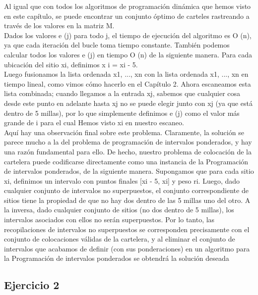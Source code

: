 \documentclass[a4paper, 12pt]{book}
\theoremstyle{dotless}
\begin{document}
Al igual que con todos los algoritmos de programación dinámica que hemos visto en este capítulo, se puede encontrar un conjunto óptimo de carteles rastreando a través de los valores en la matriz M.\\

Dados los valores e (j) para todo j, el tiempo de ejecución del algoritmo es O (n), ya que cada iteración del bucle toma tiempo constante. También podemos calcular todos los valores e (j) en tiempo O (n) de la siguiente manera. Para cada ubicación del sitio xi, definimos x i = xi - 5.\\

Luego fusionamos la lista ordenada x1, ..., xn con la lista ordenada x1, ..., xn en tiempo lineal, como vimos cómo hacerlo en el Capítulo 2. Ahora escaneamos esta lista combinada; cuando llegamos a la entrada xj, sabemos que cualquier cosa desde este punto en adelante hasta xj no se puede elegir junto con xj (ya que está dentro de 5 millas), por lo que simplemente definimos e (j) como el valor más grande de i para el cual Hemos visto xi en nuestro escaneo.\\

Aquí hay una observación final sobre este problema. Claramente, la solución se parece mucho a la del problema de programación de intervalos ponderados, y hay una razón fundamental para ello. De hecho, nuestro problema de colocación de la cartelera puede codificarse directamente como una instancia de la Programación de intervalos ponderados, de la siguiente manera. Supongamos que para cada sitio xi, definimos un intervalo con puntos finales [xi - 5, xi] y peso ri. Luego, dado cualquier conjunto de intervalos no superpuestos, el conjunto correspondiente de sitios tiene la propiedad de que no hay dos dentro de las 5 millas uno del otro. A la inversa, dado cualquier conjunto de sitios (no dos dentro de 5 millas), los intervalos asociados con ellos no serán superpuestos. Por lo tanto, las recopilaciones de intervalos no superpuestos se corresponden precisamente con el conjunto de colocaciones válidas de la cartelera, y al eliminar el conjunto de intervalos que acabamos de definir (con sus ponderaciones) en un algoritmo para la Programación de intervalos ponderados se obtendrá la solución deseada\\

\subsection*{Ejercicio 2}
\end{document}
